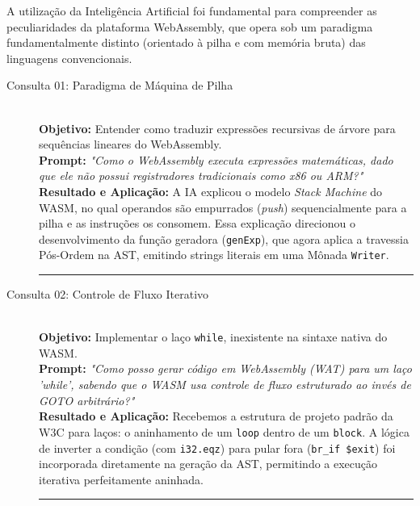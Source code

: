 \documentclass[12pt,a4paper]{article}
\begin{document}
A utilização da Inteligência Artificial foi fundamental para compreender as peculiaridades da plataforma WebAssembly, que opera sob um paradigma fundamentalmente distinto (orientado à pilha e com memória bruta) das linguagens convencionais.

\begin{description}
    \item[Consulta 01: Paradigma de Máquina de Pilha] \hfill \\
    \textbf{Objetivo:} Entender como traduzir expressões recursivas de árvore para sequências lineares do WebAssembly.\\
    \textbf{Prompt:} \textit{"Como o WebAssembly executa expressões matemáticas, dado que ele não possui registradores tradicionais como x86 ou ARM?"}\\
    \textbf{Resultado e Aplicação:} A IA explicou o modelo \textit{Stack Machine} do WASM, no qual operandos são empurrados (\textit{push}) sequencialmente para a pilha e as instruções os consomem. Essa explicação direcionou o desenvolvimento da função geradora (\texttt{genExp}), que agora aplica a travessia Pós-Ordem na AST, emitindo strings literais em uma Mônada \texttt{Writer}.

    \vspace{0.5cm}
    \hrule
    \vspace{0.5cm}
    
    \item[Consulta 02: Controle de Fluxo Iterativo] \hfill \\
    \textbf{Objetivo:} Implementar o laço \texttt{while}, inexistente na sintaxe nativa do WASM.\\
    \textbf{Prompt:} \textit{"Como posso gerar código em WebAssembly (WAT) para um laço 'while', sabendo que o WASM usa controle de fluxo estruturado ao invés de GOTO arbitrário?"}\\
    \textbf{Resultado e Aplicação:} Recebemos a estrutura de projeto padrão da W3C para laços: o aninhamento de um \texttt{loop} dentro de um \texttt{block}. A lógica de inverter a condição (com \texttt{i32.eqz}) para pular fora (\texttt{br\_if \$exit}) foi incorporada diretamente na geração da AST, permitindo a execução iterativa perfeitamente aninhada.

    \vspace{0.5cm}
    \hrule
    \vspace{0.5cm}
    

\end{description}
\end{document}
